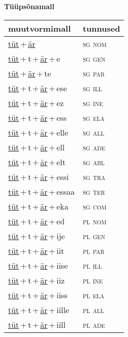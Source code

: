 
\vspace{1.8em}
\begin{minipage}{\textwidth}
\textbf{Tüüpsõnamall \,}\\

\begin{sideways}
\begin{tabular}{l l}
muutvormimall & tunnused \\
\hline
\underline{tüt}\,+\,\underline{är} & \textsc{ sg nom } \\
\underline{tüt}\,+\,t\,+\,\underline{är}\,+\,e & \textsc{ sg gen } \\
\underline{tüt}\,+\,\underline{är}\,+\,te & \textsc{ sg par } \\
\underline{tüt}\,+\,t\,+\,\underline{är}\,+\,ese & \textsc{ sg ill } \\
\underline{tüt}\,+\,t\,+\,\underline{är}\,+\,ez & \textsc{ sg ine } \\
\underline{tüt}\,+\,t\,+\,\underline{är}\,+\,ess & \textsc{ sg ela } \\
\underline{tüt}\,+\,t\,+\,\underline{är}\,+\,elle & \textsc{ sg all } \\
\underline{tüt}\,+\,t\,+\,\underline{är}\,+\,ell & \textsc{ sg ade } \\
\underline{tüt}\,+\,t\,+\,\underline{är}\,+\,elt & \textsc{ sg abl } \\
\underline{tüt}\,+\,t\,+\,\underline{är}\,+\,essi & \textsc{ sg tra } \\
\underline{tüt}\,+\,t\,+\,\underline{är}\,+\,essaa & \textsc{ sg ter } \\
\underline{tüt}\,+\,t\,+\,\underline{är}\,+\,eka & \textsc{ sg com } \\
\underline{tüt}\,+\,t\,+\,\underline{är}\,+\,ed & \textsc{ pl nom } \\
\underline{tüt}\,+\,t\,+\,\underline{är}\,+\,ije & \textsc{ pl gen } \\
\underline{tüt}\,+\,t\,+\,\underline{är}\,+\,iit & \textsc{ pl par } \\
\underline{tüt}\,+\,t\,+\,\underline{är}\,+\,iise & \textsc{ pl ill } \\
\underline{tüt}\,+\,t\,+\,\underline{är}\,+\,iiz & \textsc{ pl ine } \\
\underline{tüt}\,+\,t\,+\,\underline{är}\,+\,iiss & \textsc{ pl ela } \\
\underline{tüt}\,+\,t\,+\,\underline{är}\,+\,iille & \textsc{ pl all } \\
\underline{tüt}\,+\,t\,+\,\underline{är}\,+\,iill & \textsc{ pl ade } \\

\end{tabular}
\end{sideways}
\end{minipage}
